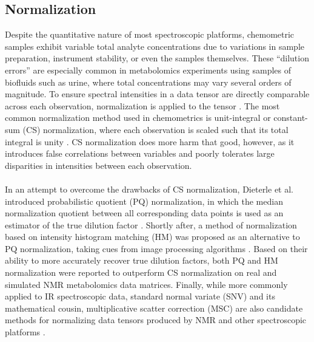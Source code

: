 \subsection{Normalization}

\begin{doublespace}
Despite the quantitative nature of most spectroscopic platforms, chemometric
samples exhibit variable total analyte concentrations due to variations in
sample preparation, instrument stability, or even the samples themselves.
These ``dilution errors'' are especially common in metabolomics experiments
using samples of biofluids such as urine, where total concentrations may vary
several orders of magnitude. To ensure spectral intensities in a data tensor
are directly comparable across each observation, normalization is applied to
the tensor \cite{worley:cmb2013}. The most common normalization method used in
chemometrics is unit-integral or constant-sum (CS) normalization, where each
observation is scaled such that its total integral is unity
\cite{craig:anchem2006}. CS normalization does more harm that good, however,
as it introduces false correlations between variables and poorly tolerates
large disparities in intensities between each observation.
\\\\
In an attempt to overcome the drawbacks of CS normalization, Dieterle et al.
introduced probabilistic quotient (PQ) normalization, in which the median
normalization quotient between all corresponding data points is used as an
estimator of the true dilution factor \cite{dieterle:anchem2006}. Shortly
after, a method of normalization based on intensity histogram matching (HM)
was proposed as an alternative to PQ normalization, taking cues from image
processing algorithms \cite{torgrip:metab2008}. Based on their ability to
more accurately recover true dilution factors, both PQ and HM normalization
were reported to outperform CS normalization on real and simulated \hnmr{}
NMR metabolomics data matrices. Finally, while more commonly applied to
IR spectroscopic data, standard normal variate (SNV) and its mathematical
cousin, multiplicative scatter correction (MSC) are also candidate methods
for normalizing data tensors produced by NMR and other spectroscopic
platforms \cite{fearn:cils2009}.
\end{doublespace}

